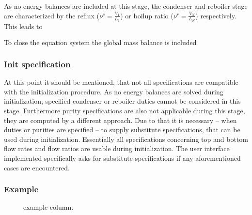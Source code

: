         As no energy balances are included at this stage, the condenser and reboiler stage
        are characterized by the reflux ($\nu^c = \frac{V_1}{L_1}$) or boilup ratio
        ($\nu^r = \frac{V_N}{L_N}$) respectively. This leads to

        To close the equation system the global mass balance is included
        \subsubsection{Init specification}
            At this point it should be mentioned, that not all specifications are compatible
            with the initialization procedure. As no energy balances are solved during initialization,
            specified condenser or reboiler duties cannot be considered in this stage. Furthermore
            purity specifications are also not applicable during this stage, they are computed by a
            different approach. Due to that it is necessary -- when duties or purities are specified
            -- to supply substitute specifications, that can be used during initialization.
            Essentially all specifications concerning top and bottom flow rates and flow ratios are
            usable during initialization. The user interface implemented specifically asks for
            substitute specifications if any aforementioned cases are encountered.

        \subsubsection{Example}

        \begin{figure}
            \begin{minipage}{0.25\textwidth}
                
                \caption{example column.}
                \label{fig:lpc_example}
            \end{minipage}
            \begin{minipage}{0.73\textwidth}
                \raisebox{\depth}{\footnotesize}
                \label{fig:lpc_example}
            \end{minipage}
        \end{figure}

